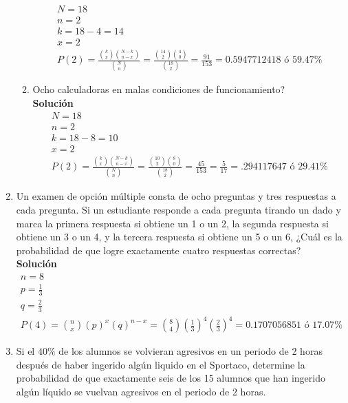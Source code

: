 \begin{enumerate}
\begin{enumerate}
        \\
        \begin{gather*}
        N=18\\
        n=2\\
        k=18-4=14\\
        x=2\\
        P(2) =\frac{\binom{k}{x}\binom{N-k}{n-x}}{\binom{N}{n}} = \frac{\binom{14}{2}\binom{4}{0}}{\binom{18}{2}} = \frac{91}{153} = 0.5947712418 \text{ ó } 59.47\%
        \end{gather*}
        \item Ocho calculadoras en malas condiciones de funcionamiento?
        \\\textbf{Solución}
        \\
        \begin{gather*}
        N=18\\
        n=2\\
        k=18-8=10\\
        x=2\\
        P(2) =\frac{\binom{k}{x}\binom{N-k}{n-x}}{\binom{N}{n}}= \frac{\binom{10}{2}\binom{8}{0}}{\binom{18}{2}} = \frac{45}{153} =\frac{5}{17} =.294117647 \text{ ó } 29.41\%
        \end{gather*}
    \end{enumerate}
    \item Un examen de opción múltiple consta de ocho preguntas y tres respuestas a cada pregunta. Si un estudiante responde a cada pregunta tirando un dado y marca la primera respuesta si obtiene un 1 o un 2, la segunda respuesta si obtiene un 3 o un 4, y la tercera respuesta si obtiene un 5 o un 6, ¿Cuál es la probabilidad de que logre exactamente cuatro respuestas correctas?
    \\\textbf{Solución}
    \\
    \begin{gather*}
    n=8\\
    p=\frac{1}{3}\\
    q=\frac{2}{3}\\
    P(4) =\binom{n}{x}\left(p\right)^{x}\left(q\right)^{n-x}= \binom{8}{4}\left(\frac{1}{3}\right)^{4}\left(\frac{2}{3}\right)^{4}=0.1707056851 \text{ ó } 17.07\%
    \end{gather*}
    \item Si el $40\%$ de los alumnos se volvieran agresivos en un periodo de 2 horas después de haber ingerido algún liquido en el Sportaco, determine la probabilidad de que exactamente seis de los 15 alumnos que han ingerido algún líquido se vuelvan agresivos en el periodo de 2 horas.

\end{enumerate}
